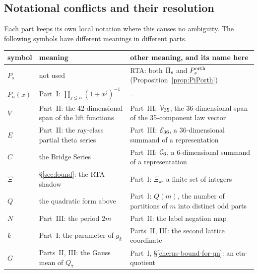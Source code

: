 \subsection{Notational conflicts and their resolution}
Each part keeps its own local notation where this causes no ambiguity. The following symbols have different meanings in different parts.
\begin{center}\small
\begin{longtable}{p{2.6cm}p{6.2cm}p{6.2cm}}\toprule
symbol & meaning & other meaning, and its name here\\\midrule\endhead
$P_s$ & not used & RTA: both $\Pi_s$ and $P^{\mathrm{orth}}_s$ (Proposition~\ref{prop:PiPorth})\\
$P_n(x)$ & Part~I: $\prod_{j\le n}(1+x^j)^{-1}$ & --\\
$V$ & Part~II: the $42$-dimensional span of the lift functions & Part~III: $\mathcal V_{35}$, the $36$-dimensional span of the 35-component law vector\\
$E$ & Part~II: the ray-class partial theta series & Part~III: $\mathcal E_{36}$, a $36$-dimensional summand of a representation\\
$C$ & the Bridge Series & Part~III: $\mathcal C_{6}$, a $6$-dimensional summand of a representation\\
$\Xi$ & \S\ref{sec:found}: the RTA shadow & Part~I: $\Xi_k$, a finite set of integers\\
$Q$ & the quadratic form above & Part~I: $Q(m)$, the number of partitions of $m$ into distinct odd parts\\
$N$ & Part~III: the period $2m$ & Part~II: the label negation map\\
$k$ & Part~I: the parameter of $g_k$ & Parts~II, III: the second lattice coordinate\\
$G$ & Parts~II, III: the Gauss mean of $Q_7$ & Part~I, \S\ref{cherns-bound-for-qn}: an eta-quotient\\
\bottomrule
\end{longtable}
\end{center}
